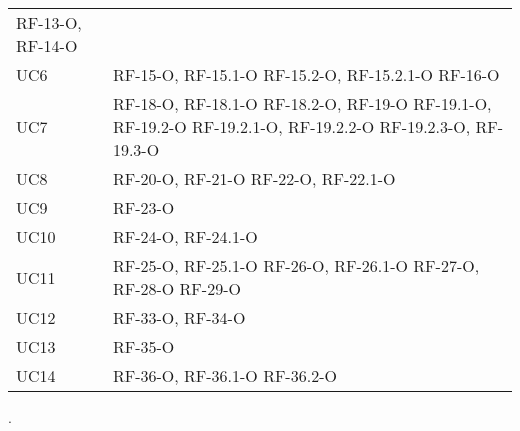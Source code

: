 \begin{longtable}{ 
		>{\centering}p{} 
		>{}p{} }
RF-13-O, RF-14-O\tabularnewline
UC6 &
RF-15-O, RF-15.1-O\newline
RF-15.2-O, RF-15.2.1-O\newline
RF-16-O\tabularnewline
UC7 &
RF-18-O, RF-18.1-O\newline
RF-18.2-O, RF-19-O\newline
RF-19.1-O, RF-19.2-O\newline
RF-19.2.1-O, RF-19.2.2-O\newline
RF-19.2.3-O, RF-19.3-O\tabularnewline
UC8 &
RF-20-O, RF-21-O\newline
RF-22-O, RF-22.1-O\tabularnewline
UC9 &
RF-23-O\tabularnewline
UC10 &
RF-24-O, RF-24.1-O\tabularnewline
UC11 &
RF-25-O, RF-25.1-O\newline
RF-26-O, RF-26.1-O\newline
RF-27-O, RF-28-O\newline
RF-29-O\tabularnewline
UC12 &
RF-33-O, RF-34-O\tabularnewline
UC13 &
RF-35-O\tabularnewline
UC14 &
RF-36-O, RF-36.1-O\newline
RF-36.2-O\tabularnewline
\end{longtable}.\newline

